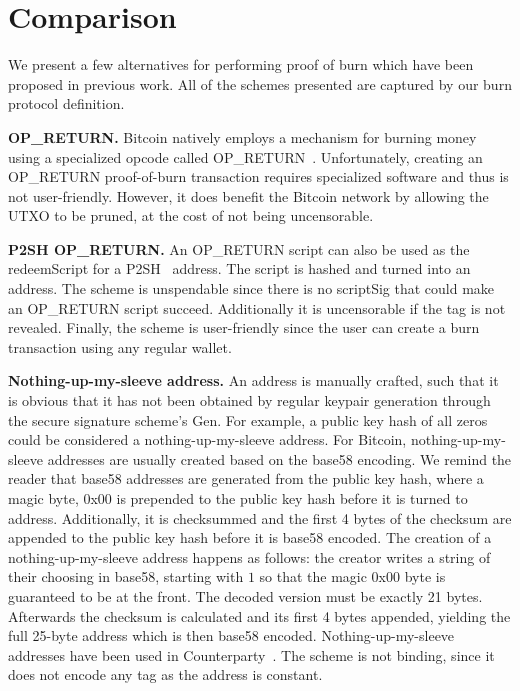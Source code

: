 \section{Comparison}

We present a few alternatives for performing proof of burn which have been proposed in previous work. All of the schemes presented are captured by our burn protocol definition.

\noindent
\textbf{OP\_RETURN.}
Bitcoin natively employs a mechanism for burning money using a specialized
opcode called OP\_RETURN~\cite{bartoletti2017analysis}. Unfortunately,
creating an OP\_RETURN proof-of-burn transaction requires specialized software and thus is not
user-friendly. However, it does benefit the Bitcoin network by allowing the UTXO
to be pruned, at the cost of not being uncensorable.

\noindent
\textbf{P2SH OP\_RETURN.}
An OP\_RETURN script can also be used as the redeemScript for a P2SH~\cite{p2sh} address. The script is hashed and turned into an address. The scheme is unspendable since there is no scriptSig that could make an OP\_RETURN script succeed. Additionally it is uncensorable if the tag is not revealed. Finally, the scheme is user-friendly since the user can create a burn transaction using any regular wallet.

\noindent
\textbf{Nothing-up-my-sleeve address.}
An address is manually crafted, such that it is obvious that it has not been obtained by regular keypair generation through the secure signature scheme's \textsf{Gen}. For example, a public key hash of all zeros could be considered a nothing-up-my-sleeve address. For Bitcoin, nothing-up-my-sleeve addresses are usually created based on the base58 encoding. We remind the reader that base58 addresses are generated from the public key hash, where a magic byte, 0x00 is prepended to the public key hash before it is turned to address. Additionally, it is checksummed and the first 4 bytes of the checksum are appended to the public key hash before it is base58 encoded. The creation of a nothing-up-my-sleeve address happens as follows: the creator writes a string of their choosing in base58, starting with $1$ so that the magic 0x00 byte is guaranteed to be at the front. The decoded version must be exactly 21 bytes. Afterwards the checksum is calculated and its first 4 bytes appended, yielding the full 25-byte address which is then base58 encoded. Nothing-up-my-sleeve addresses have been used in Counterparty~\cite{counterparty}. The scheme is not binding, since it does not encode any tag as the address is constant.

